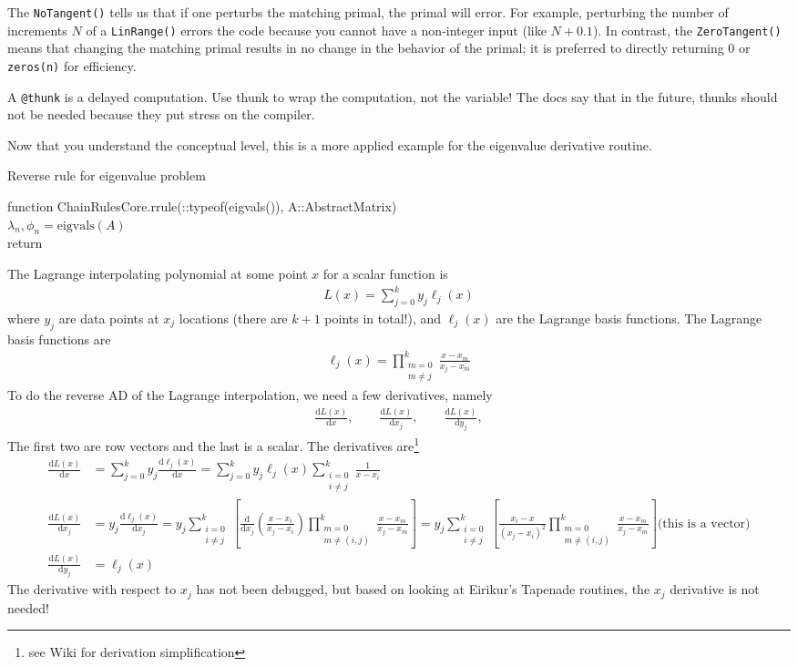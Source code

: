 \documentclass[10pt]{article}
\newcommand{\dd}[2]{\frac{\textrm{d} #1}{\textrm{d} #2}}
\newcommand{\ben}{\begin{eqnarray*}}
\newcommand{\een}{\end{eqnarray*}}
\newcommand{\beq}{\begin{equation}\begin{aligned}}
\newcommand{\eeq}{\end{aligned}\end{equation}}
\newcommand{\tn}[1]{\textrm{#1}}
\begin{document}
The \texttt{NoTangent()} tells us that if one perturbs the matching primal, the primal will error.
For example, perturbing the number of increments $N$ of a \texttt{LinRange()} errors the code because you cannot have a non-integer input (like $N+0.1$).
In contrast, the \texttt{ZeroTangent()} means that changing the matching primal results in no change in the behavior of the primal;
it is preferred to directly returning 0 or \texttt{zeros(n)} for efficiency.

A \texttt{@thunk} is a delayed computation.
Use thunk to wrap the computation, not the variable!
The docs say that in the future, thunks should not be needed because they put stress on the compiler.

Now that you understand the conceptual level, this is a more applied example for the eigenvalue derivative routine.
\begin{algorithm}[htb!]
	\caption{\label{alg:EigenRAD} Reverse rule for eigenvalue problem}
	function ChainRulesCore.rrule(::typeof(eigvals()), A::AbstractMatrix)\\
	\quad $\lambda_n, \phi_n = \tn{eigvals}(A)$ \\
	return
\end{algorithm}

The Lagrange interpolating polynomial at some point $x$ for a scalar function is
\beq
L(x) = \sum_{j=0}^{k} y_j \ell_j(x)
\eeq
where $y_j$ are data points at $x_j$ locations (there are $k+1$ points in total!), and $\ell_j(x)$ are the Lagrange basis functions.
The Lagrange basis functions are
\beq
\ell_j(x) = \prod_{\substack{m=0 \\ m \neq j}}^{k} \frac{x-x_m}{x_j-x_m}
\eeq
To do the reverse AD of the Lagrange interpolation, we need a few derivatives, namely
\ben
\dd{L(x)}{x},
\qquad
\dd{L(x)}{x_j},
\qquad
\dd{L(x)}{y_j},
\een
The first two are row vectors and the last is a scalar.
The derivatives are\footnote{see Wiki for derivation simplification}
\beq
\dd{L(x)}{x} &= \sum_{j=0}^{k} y_j \dd{\ell_j(x)}{x}
=
\sum_{j=0}^{k} y_j { \ell_j(x) \sum_{\substack{i=0\\i\neq j}}^{k} \frac{1}{x - x_i}}
\\
\dd{L(x)}{x_j} &=  y_j \dd{\ell_j(x)}{x_j} =
y_j \sum_{\substack{i=0 \\ i \neq j}}^{k} \left[
	\dd{}{x_j}\left(
	\frac{x-x_i}{x_j-x_i}
	\right)
	\prod_{\substack{m=0 \\m\neq (i,j)}}^{k} \frac{x-x_m}{x_j-x_m}
	\right]
=
y_j \sum_{\substack{i=0 \\ i \neq j}}^{k} \left[
	\frac{x_i - x}{(x_j-x_i)^2} \prod_{\substack{m=0 \\m\neq (i,j)}}^{k} \frac{x-x_m}{x_j-x_m}
	\right]
\tn{(this is a vector)}
\\
\dd{L(x)}{y_j} &=  \ell_j(x)
\eeq
The derivative with respect to $x_j$ has not been debugged, but based on looking at Eirikur's Tapenade routines, the $x_j$ derivative is not needed!
\end{document}
